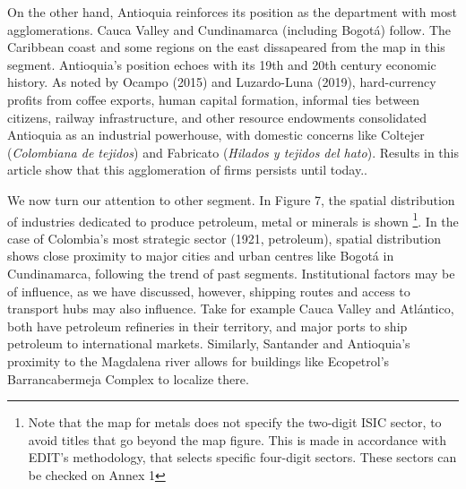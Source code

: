 \documentclass[12pt,a4paper]{article}
\begin{document}
On the other hand, Antioquia reinforces its position as the department with most agglomerations. Cauca Valley and Cundinamarca (including Bogotá) follow. The Caribbean coast and some regions on the east dissapeared from the map in this segment. Antioquia's position echoes with its 19th and 20th century economic history. As noted by Ocampo (2015) and Luzardo-Luna (2019), hard-currency profits from coffee exports, human capital formation, informal ties between citizens, railway infrastructure, and other resource endowments consolidated Antioquia as an industrial powerhouse, with domestic concerns like Coltejer (\textit{Colombiana de tejidos}) and Fabricato (\textit{Hilados y tejidos del hato}). Results in this article show that this agglomeration of firms persists until today.. \newpage

We now turn our attention to other segment. In Figure 7, the spatial distribution of industries dedicated to produce petroleum, metal or minerals is shown \footnote{Note that the map for metals does not specify the two-digit ISIC sector, to avoid titles that go beyond the map figure. This is made in accordance with EDIT's methodology, that selects specific four-digit sectors. These sectors can be checked on Annex 1}. In the case of Colombia's most strategic sector (1921, petroleum), spatial distribution shows close proximity to major cities and urban centres like Bogotá in Cundinamarca, following the trend of past segments. Institutional factors may be of influence, as we have discussed, however, shipping routes and access to transport hubs may also influence. Take for example Cauca Valley and Atlántico, both have petroleum refineries in their territory, and major ports to ship petroleum to international markets. Similarly, Santander and Antioquia's proximity to the Magdalena river allows for buildings like Ecopetrol's Barrancabermeja Complex to localize there.
\end{document}
